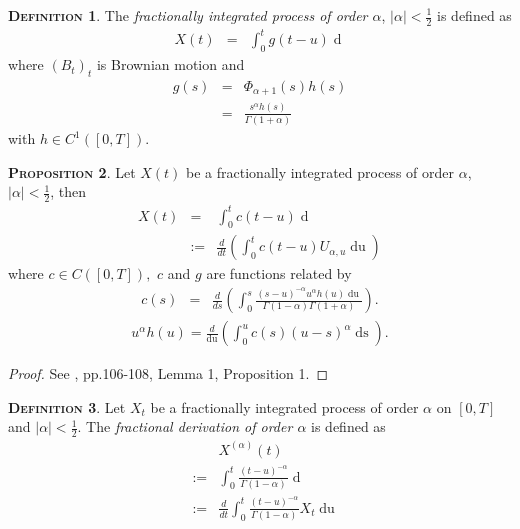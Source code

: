 \documentclass[a4paper, twoside, 11pt]{article}
\theoremstyle{definition}
\newtheorem{definition}{\scshape Definition}[section]
\newtheorem{proposition}[definition]{\scshape Proposition}
\newcommand{\brkt}[1]{\left({#1} \right)}
\begin{document}
\begin{definition}
  The \emph{fractionally integrated process of order $\alpha$}, $|\alpha| < \frac{1}{2}$ is defined as
  \begin{eqnarray}
	X(t) &=&  \int_0^{t} g(t - u) \mathop{dB_u}
	\label{sec:frac}
  \end{eqnarray}
  where $(B_t)_t$ is Brownian motion and 
  \begin{eqnarray}
	g(s) &=& \Phi_{\alpha+1}(s)h(s)\\
	&=& \frac{s^\alpha h(s)}{\Gamma(1+\alpha)}
	\label{sec:wer}
  \end{eqnarray}
  with $h \in C^1([0, T])$.
\end{definition}
\begin{proposition}
  Let $X(t)$ be a fractionally integrated process of order $\alpha$, $|\alpha| < \frac{1}{2}$, then
  \begin{eqnarray}
	X(t) &=& \int_0^t c(t-u)\mathop{dU_{\alpha, u}}\\
	&:=& \frac{d}{dt}\brkt{\int_0^t c(t-u) U_{\alpha, u} \mathop{du}}
	\label{sec:bb1}
  \end{eqnarray}
  where $c \in C([0, T]),$ $c$ and $g$ are functions related by
  \begin{eqnarray}
	c(s) &=& \frac{d}{ds}\brkt{\int_0^s \frac{(s-u)^{-\alpha}u^\alpha h(u) \mathop{du}}{\Gamma(1-\alpha)\Gamma(1+\alpha)}}.
\label{sec:frac2}
  \end{eqnarray}
  \begin{eqnarray}
	u^\alpha h(u) = \frac{d}{\mathop{du}}\brkt{\int_0^u c(s) (u-s)^\alpha \mathop{ds}}.
	\label{sec:frac3}
  \end{eqnarray}
\end{proposition}

\begin{proof}
  See \cite{core}, pp.106-108, Lemma 1, Proposition 1. 
\end{proof}
\begin{definition}
  Let  $X_t$ be a fractionally integrated process of order $\alpha$ on $[0, T]$ and $|\alpha| < \frac{1}{2}$. The \emph{fractional derivation of order $\alpha$} is defined as
  \begin{eqnarray}
   && X^{(\alpha)}(t)\nonumber\\
	&:=&  \int_0^t \frac{(t-u)^{-\alpha}}{\Gamma(1-\alpha)} \mathop{dX_{t}}\nonumber\\
    &:=&  \frac{d}{dt}\int_0^t \frac{(t-u)^{-\alpha}}{\Gamma(1-\alpha)} X_{t} \mathop{du} \nonumber
	\label{sec:cc4}
  \end{eqnarray}
\end{definition}
\end{document}
